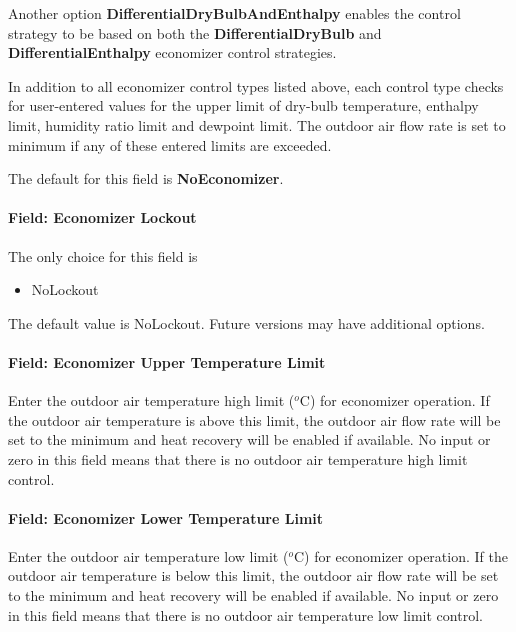 Another option \textbf{DifferentialDryBulbAndEnthalpy} enables the control strategy to be based on both the \textbf{DifferentialDryBulb} and \textbf{DifferentialEnthalpy} economizer control strategies.

In addition to all economizer control types listed above, each control type checks for user-entered values for the upper limit of dry-bulb temperature, enthalpy limit, humidity ratio limit and dewpoint limit. The outdoor air flow rate is set to minimum if any of these entered limits are exceeded.

The default for this field is \textbf{NoEconomizer}.

\paragraph{Field: Economizer Lockout}\label{field-economizer-lockout-5}

The only choice for this field is

\begin{itemize}
\tightlist
\item
  NoLockout
\end{itemize}

The default value is NoLockout. Future versions may have additional options.

\paragraph{Field: Economizer Upper Temperature Limit}\label{field-economizer-upper-temperature-limit-3}

Enter the outdoor air temperature high limit (\(^{o}\)C) for economizer operation. If the outdoor air temperature is above this limit, the outdoor air flow rate will be set to the minimum and heat recovery will be enabled if available. No input or zero in this field means that there is no outdoor air temperature high limit control.

\paragraph{Field: Economizer Lower Temperature Limit}\label{field-economizer-lower-temperature-limit-3}

Enter the outdoor air temperature low limit (\(^{o}\)C) for economizer operation. If the outdoor air temperature is below this limit, the outdoor air flow rate will be set to the minimum and heat recovery will be enabled if available. No input or zero in this field means that there is no outdoor air temperature low limit control.

